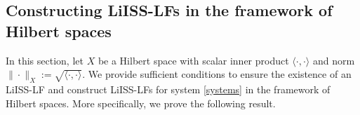 \documentclass[onecolumn]{autart}
\newtheorem{definition}{Definition}
\newenvironment{proof of Prop.ODE}{{\it Proof of Proposition~\ref{Prop.ODE}:\enspace}}{\hfill $\blacksquare$\par}
\newenvironment{proof of PDE}{{\it Proof of Proposition \ref{Prop.8}:\enspace}}{\hfill $\blacksquare$\par}
\begin{document}
{\subsection{Constructing LiISS-LFs   in the framework of Hilbert spaces}\label{sec:3}
In this section, let $ X $  be  a Hilbert space  with   scalar inner product $\langle \cdot,\cdot \rangle$ and   norm $\| \cdot \|_ X :=\sqrt{\langle \cdot,\cdot \rangle}$. %
We provide sufficient conditions to ensure the existence of an LiISS-LF and construct LiISS-LFs for system \eqref{systems}  in the framework of Hilbert spaces. More specifically, we prove the following result.
%

}
\end{document}
